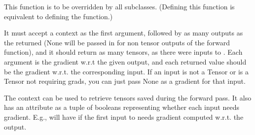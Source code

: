 \documentclass[letterpaper,10pt,english]{sphinxmanual}
\begin{document}
\begin{fulllineitems}
\begin{fulllineitems}
\sphinxAtStartPar
This function is to be overridden by all subclasses.
(Defining this function is equivalent to defining the  function.)

\sphinxAtStartPar
It must accept a context  as the first argument, followed by
as many outputs as the {\hyperref[\detokenize{dtw_loss_functions.soft_dtw_implementations.soft_dtw_cuda_ron.autograd:dtw_loss_functions.soft_dtw_implementations.soft_dtw_cuda_ron.autograd.SoftDTWAutograd.forward}]{}} returned (None will be passed in
for non tensor outputs of the forward function),
and it should return as many tensors, as there were inputs to
{\hyperref[\detokenize{dtw_loss_functions.soft_dtw_implementations.soft_dtw_cuda_ron.autograd:dtw_loss_functions.soft_dtw_implementations.soft_dtw_cuda_ron.autograd.SoftDTWAutograd.forward}]{}}. Each argument is the gradient w.r.t the given output,
and each returned value should be the gradient w.r.t. the
corresponding input. If an input is not a Tensor or is a Tensor not
requiring grads, you can just pass None as a gradient for that input.

\sphinxAtStartPar
The context can be used to retrieve tensors saved during the forward
pass. It also has an attribute  as a tuple
of booleans representing whether each input needs gradient. E.g.,
{\hyperref[\detokenize{dtw_loss_functions.soft_dtw_implementations.soft_dtw_cuda_ron.autograd:dtw_loss_functions.soft_dtw_implementations.soft_dtw_cuda_ron.autograd.SoftDTWAutograd.backward}]{}} will have  if the
first input to {\hyperref[\detokenize{dtw_loss_functions.soft_dtw_implementations.soft_dtw_cuda_ron.autograd:dtw_loss_functions.soft_dtw_implementations.soft_dtw_cuda_ron.autograd.SoftDTWAutograd.forward}]{}} needs gradient computed w.r.t. the
output.

\end{fulllineitems}



\end{fulllineitems}
\end{document}
